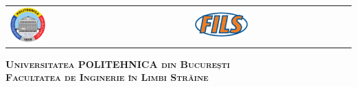 



\begin{titlepage}
	\centering
	\begin{tabular}{p{5cm}p{5.6cm}}
		\includegraphics[width=0.2\textwidth]{img/upb.png} &
		\includegraphics[width=0.35\textwidth]{img/fils.png}
	\end{tabular}
	\vspace{1cm}

	{\scshape\Large \textbf{Universitatea POLITEHNICA din București} \\}
	{\scshape\Large \textbf{Facultatea de Inginerie în Limbi Străine} \\}
	
\end{titlepage}

